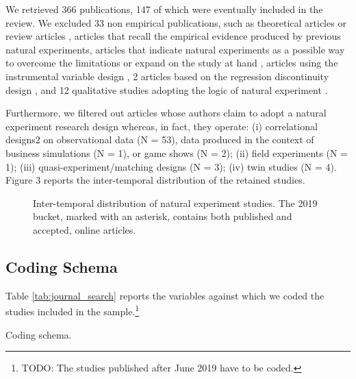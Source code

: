 \documentclass[nobib]{tufte-handout}
\newcommand{\todo}[1]{}
\renewcommand{\todo}[1]{{\color{red} TODO: {#1}}}
\begin{document}
\begin{refsection}
We retrieved 366 publications, 147 of which were eventually included in the review. 
We excluded 33 non empirical publications, such as theoretical
articles \parencite[e.g.,][]{makadok2011} or review articles \parencite[e.g.,][]{shaver2020},
articles that recall the empirical evidence produced by previous natural
experiments, articles that indicate natural experiments as a possible way to
overcome the limitations or expand on the study at hand \parencite[e.g.,][]{hsu2006},
articles using the instrumental variable design \parencite[e.g.,][]{zoloty2018}, 2 articles based on the regression discontinuity
design \parencite[e.g.,][]{flammer2015}, and 12 qualitative studies adopting the logic of
natural experiment \parencite[e.g.,][]{powell2017}.

Furthermore, we filtered out articles whose authors claim to adopt a natural
experiment research design whereas, in fact, they operate: (i) correlational
designs2 on observational data (N = 53), data produced in the context of
business simulations (N = 1), or game shows (N = 2); (ii) field experiments (N =
1); (iii) quasi-experiment/matching designs (N = 3); (iv) twin studies (N = 4).
Figure 3 reports the inter-temporal distribution of the retained studies.

\begin{figure}[]
    \centering
    
    \caption{Inter-temporal distribution of natural experiment studies.
    The 2019 bucket, marked with an asterisk, contains both published and 
    accepted, online articles.}
    \label{fig:studies_over_time}
\end{figure}

\subsection{Coding Schema}
\label{sub:coding_schema}

Table \ref{tab:journal_search} reports the variables against which we coded 
the studies included in the sample.\footnote{\todo{The studies published after June 2019 
have to be coded.}}

\begin{table}
    \large
    \sffamily
    \begin{small}
        \caption{}
        \label{tab:coding_schema}
        \begin{center}
            
        \end{center}
    \end{small}
    \caption{Coding schema.}
\end{table}



\end{refsection}
\end{document}
